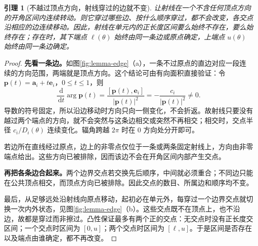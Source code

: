 \documentclass[UTF8,11pt,a4paper,fontset=fandol]{ctexart}
\numberwithin{equation}{section}
\newtheorem{lemma}[theorem]{引理}
\newcommand{\dd}{\,\mathrm d}
\begin{document}
\begin{lemma}[不越过顶点方向，射线穿过的边就不变]\label{lem:edge}
让射线在一个不含任何顶点方向的开角区间内连续转动。则它穿过哪些边、按什么顺序穿过，都不会改变，各交点沿相应的边连续移动。因此，射线在单元内的正长度区间要么始终不存在，要么始终存在；存在时，其下端点 $\ell(\theta)$ 始终由同一条边或原点确定，上端点 $u(\theta)$ 始终由同一条边确定。
\end{lemma}
\begin{proof}
\textbf{先看一条边。}如图\ref{fig:lemma-edge}（a），一条不过原点的直边对应一段连续的方向范围，两端就是顶点方向。这个结论可由有向面积直接验证：令
$\bm{p}(t)=\bm{a}_i+t\bm{e}_i$，$0\leq t\leq1$，则
\begin{equation}\label{eq:anglederivative}
 \frac{\dd}{\dd t}\arg\bm{p}(t)
 =\frac{[\bm{p}(t),\bm{e}_i]}{|\bm{p}(t)|^2}
 =-\frac{c_i}{|\bm{p}(t)|^2}\ne0.
\end{equation}
导数的符号固定，所以沿边移动时方向只向一侧变化，不会折返。故射线只要没有越过两个端点的方向，就不会突然与这条边相交或突然不再相交；相交时，交点半径 $c_i/D_i(\theta)$ 连续变化。辐角跨越 $2\pi$ 时在 $0$ 方向处分开即可。

若边所在直线经过原点，边上的非零点仅位于一条或两条固定射线上，方向由非零端点给出。这些方向已被排除，因而该边不会在开角区间内部产生交点。

\textbf{再把各条边合起来。}两个边界交点若交换先后顺序，中间就必须重合；不同边只能在公共顶点相交，而顶点方向已被排除。因此交点的数目、所属边和顺序均不变。

最后，从足够远处沿射线向原点移动，起初必在单元外，每穿过一个边界交点就切换一次内外状态，见图\ref{fig:lemma-edge}（b）。这些交点既不在顶点上，也不沿边，故都是穿过而非擦过。凸性保证最多有两个正的交点：无交点时没有正长度交区间；一个交点时区间为 $[0,u]$；两个交点时区间为 $[\ell,u]$。于是区间是否存在以及端点由谁确定，都不再改变。
\end{proof}
\end{document}
